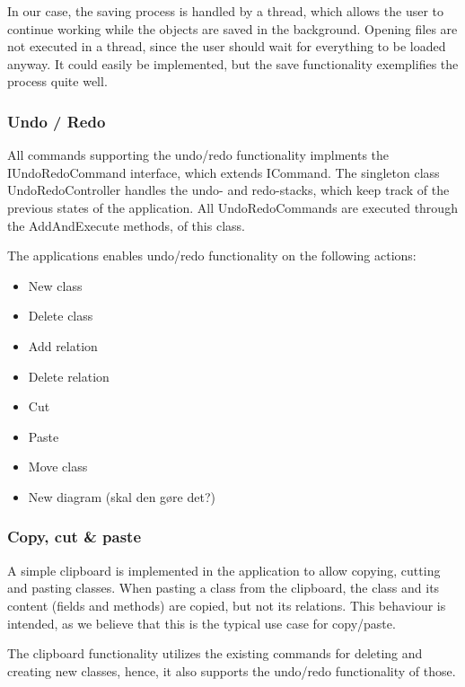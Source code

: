 In our case, the saving process is handled by a thread, which allows the user to
continue working while the objects are saved in the background. Opening files
are not executed in a thread, since the user should wait for everything to be
loaded anyway. It could easily be implemented, but the save functionality
exemplifies the process quite well.


\subsubsection{Undo / Redo}
All commands supporting the undo/redo functionality implments the
IUndoRedoCommand interface, which extends ICommand. The singleton class
UndoRedoController handles the undo- and redo-stacks, which keep track of the
previous states of the application. All UndoRedoCommands are executed through
the AddAndExecute methods, of this class.

The applications enables undo/redo functionality on the following actions:


\begin{itemize} 
	\item New class 
	\item Delete class 
	\item Add relation 
	\item Delete relation 
	\item Cut 
	\item Paste 
	\item Move class 
	\item New diagram (skal den gøre det?) 
\end{itemize}


\subsubsection{Copy, cut \& paste} 

A simple clipboard is implemented in the
application to allow copying, cutting and pasting classes. When pasting a class
from the clipboard, the class and its content (fields and methods) are copied,
but not its relations. This behaviour is intended, as we believe that this is
the typical use case for copy/paste.

The clipboard functionality utilizes the existing commands for deleting and
creating new classes, hence, it also supports the undo/redo functionality of
those.


